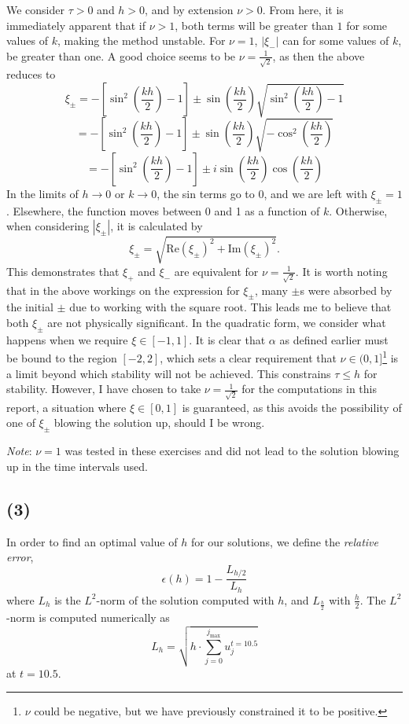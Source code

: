 \documentclass[10pt]{article}
\begin{document}
We consider $\tau >0$ and $h>0$, and by extension $\nu>0$.
From here, it is immediately apparent that if $\nu >1$, both terms will be greater
than $1$ for some values of $k$, making the method unstable.
For $\nu = 1$, $|\xi_-|$ can for some values of $k$, be greater than one.
A good choice seems to be $\nu = \frac{1}{\sqrt{2}}$, as then the above reduces to
$$\xi_\pm = -\left[\sin^2\left(\frac{kh}{2}\right) - 1 \right] \pm \sin\left(\frac{kh}{2}\right)
\sqrt{\sin^2\left(\frac{kh}{2}\right) -1}$$
$$= -\left[\sin^2\left(\frac{kh}{2}\right) - 1 \right] \pm \sin\left(\frac{kh}{2}\right)
\sqrt{-\cos^2\left(\frac{kh}{2}\right)}$$
$$= -\left[\sin^2\left(\frac{kh}{2}\right) - 1 \right] \pm i\sin\left(\frac{kh}{2}\right)
\cos\left(\frac{kh}{2}\right)$$
In the limits of $h \to 0$ or $k \to 0$, the sin terms go to 0, and we are left with
$\xi_\pm = 1$. Elsewhere, the function moves between 0 and 1 as a function of $k$.
Otherwise, when considering $|\xi_\pm|$, it is calculated by
$$ \xi_\pm = \sqrt{\text{Re}\left(\xi_\pm\right)^2 + \text{Im}\left(\xi_\pm\right)^2}.$$
This demonstrates that $\xi_+$ and $\xi_-$ are equivalent for $\nu=\frac{1}{\sqrt{2}}$.
It is worth noting that in
the above workings on the expression for $\xi_\pm$, many $\pm$s were absorbed by the
initial $\pm$ due to working with the square root. This leads me to believe that both
$\xi_\pm$ are not physically significant.
In the quadratic form, we consider what happens when we require $\xi \in [-1,1]$.
It is clear that $\alpha$ as defined earlier must be bound to the region $[-2,2]$,
which sets a clear requirement that $\nu \in (0,1]$\footnote{$\nu$ could be negative, but
we have previously constrained it to be positive.}
is a limit beyond which stability will not be achieved. This constrains
$\tau \le h$ for stability.
However, I have chosen to take $\nu = \frac{1}{\sqrt{2}}$
for the computations in this report, a situation where $\xi \in [0,1]$ is guaranteed,
as this avoids the possibility of one of $\xi_\pm$ blowing the solution up, should I be wrong.

{\it Note}: $\nu = 1$ was tested in these exercises and did not lead to the solution
blowing up in the time intervals used.

\clearpage
\subsection*{(3)}
In order to find an optimal value of $h$ for our solutions, we define the {\it relative
error},
\begin{equation}
\epsilon (h) = 1 - \frac{L_{h/2}}{L_h}
\label{e:err}
\end{equation}
where $L_h$ is the $L^2$-norm of the solution computed with $h$, and $L_\frac{h}{2}$ with
$\frac{h}{2}$.
The $L^2$-norm is computed numerically as
\begin{equation}
L_h  = \sqrt{h\cdot \sum_{j=0}^{j_\text{max}} u_{j}^{t=10.5}}
\label{e:l2}
\end{equation}
at $t=10.5$.
\end{document}

